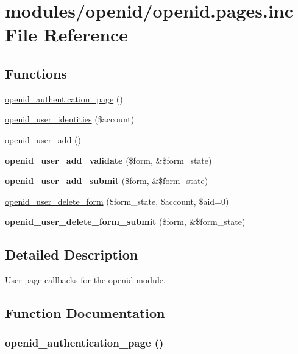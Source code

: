 \hypertarget{openid_8pages_8inc}{
\section{modules/openid/openid.pages.inc File Reference}
\label{openid_8pages_8inc}
}
\subsection*{Functions}
\begin{CompactItemize}
\item 
\hyperlink{openid_8pages_8inc_4dd922a70115cdc900fdfd9afaa24f7b}{openid\_\-authentication\_\-page} ()
\item 
\hyperlink{openid_8pages_8inc_0f409e32ec8c303f8143f13f79eae76c}{openid\_\-user\_\-identities} (\$account)
\item 
\hyperlink{group__forms_g53081778c1fc8e8ff8ab89f9000774b7}{openid\_\-user\_\-add} ()
\item 
\hypertarget{openid_8pages_8inc_f97413d9c74c746bb7516d1917a88e2a}{
\textbf{openid\_\-user\_\-add\_\-validate} (\$form, \&\$form\_\-state)}
\label{openid_8pages_8inc_f97413d9c74c746bb7516d1917a88e2a}

\item 
\hypertarget{openid_8pages_8inc_cd7a6972fa84954fda71166a59b17fe3}{
\textbf{openid\_\-user\_\-add\_\-submit} (\$form, \&\$form\_\-state)}
\label{openid_8pages_8inc_cd7a6972fa84954fda71166a59b17fe3}

\item 
\hyperlink{group__forms_g7c3c27b57a24d9eba5aaf93482f21bb7}{openid\_\-user\_\-delete\_\-form} (\$form\_\-state, \$account, \$aid=0)
\item 
\hypertarget{openid_8pages_8inc_ac850d86b78109116bc3644660f94074}{
\textbf{openid\_\-user\_\-delete\_\-form\_\-submit} (\$form, \&\$form\_\-state)}
\label{openid_8pages_8inc_ac850d86b78109116bc3644660f94074}

\end{CompactItemize}


\subsection{Detailed Description}
User page callbacks for the openid module. 

\subsection{Function Documentation}
\hypertarget{openid_8pages_8inc_4dd922a70115cdc900fdfd9afaa24f7b}{
\subsubsection[{openid\_\-authentication\_\-page}]{\setlength{\rightskip}{0pt plus 5cm}openid\_\-authentication\_\-page ()}}
\label{openid_8pages_8inc_4dd922a70115cdc900fdfd9afaa24f7b}



